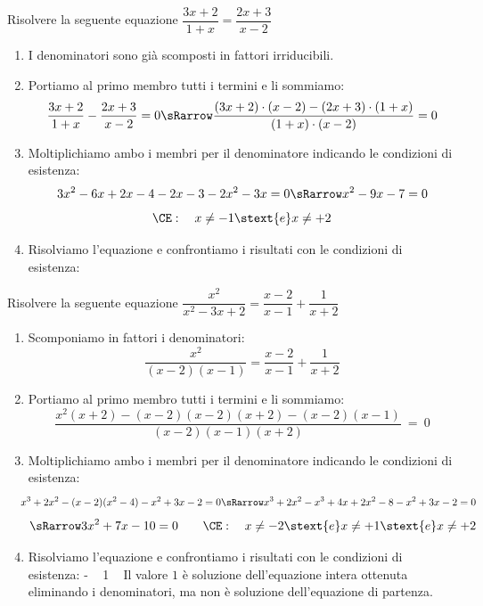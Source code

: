 \begin{esempio}{}{}
Risolvere la seguente equazione 
\(\dfrac{3x +2}{1 +x}=\dfrac{2x +3}{x -2}\)
\begin{enumerate} [noitemsep, left=0mm]
\item I denominatori sono già scomposti in fattori irriducibili.
\item Portiamo al primo membro tutti i termini e li sommiamo:
\[\dfrac{3x +2}{1 +x} -\dfrac{2x +3}{x -2} = 0 \sRarrow  
\dfrac{(3x +2) \cdot (x -2) -(2x +3) \cdot (1 +x)}{(1 +x) \cdot (x -2)}=0\]
\item Moltiplichiamo ambo i membri per il denominatore 
indicando le condizioni di esistenza: 
\[3x^2 -6x +2x -4 -2x -3 -2x^2 -3x = 0 \sRarrow x^2 -9x -7 = 0\]
\[\CE: \quad x \neq -1 \stext{e} x \neq +2\]
\item Risolviamo l'equazione e confrontiamo i risultati con 
le condizioni di esistenza:
{\small
{}
      { ~ }
      { ~ }
} %
\end{enumerate}
\end{esempio}

\begin{esempio}{}{}
Risolvere la seguente equazione 
\(\dfrac{x^2}{x^2 -3 x +2}=\dfrac{x -2}{x -1} +\dfrac{1}{x +2}\)
\begin{enumerate} [noitemsep, left=0mm]
\item Scomponiamo in fattori i denominatori:
\[\dfrac{x^2}{(x -2)(x -1)}=\dfrac{x -2}{x -1} +\dfrac{1}{x +2}\]
\item Portiamo al primo membro tutti i termini e li sommiamo:
\[\dfrac{x^2(x +2) -(x -2)(x -2)(x +2) -(x -2)(x -1)}
       {( x -2 ) ( x -1 ) ( x +2 )}~=~0\]
\item Moltiplichiamo ambo i membri per il denominatore 
indicando le condizioni di esistenza: 
{\small
\[\hspace*{-3mm}x^3 +2x^2 -(x -2)(x^2 -4) -x^2 +3x -2 = 0 \sRarrow
x^3 +2x^2 -x^3 +4x +2x^2 -8 -x^2 +3x -2 = 0
\]
}
\[\sRarrow 3x^2 +7x -10 = 0 \qquad
\CE: \quad x \neq -2 \stext{e} x \neq +1 \stext{e} x \neq +2\]
\item Risolviamo l'equazione e confrontiamo i risultati con 
le condizioni di esistenza:
{\small
{}
      {- ~ }
      {1 ~ }
} %
Il valore \(1\) è soluzione dell'equazione intera ottenuta eliminando i 
denominatori, ma non è soluzione dell'equazione di partenza.
\end{enumerate}
\end{esempio}

